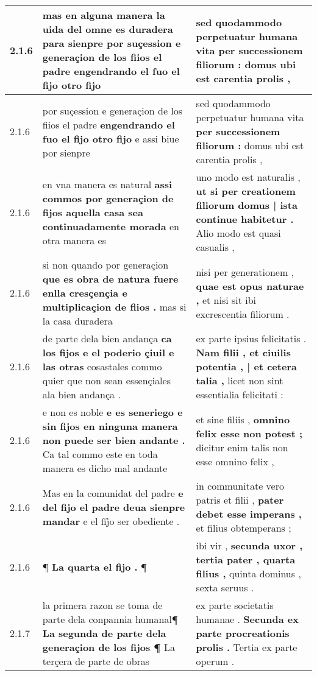\begin{tabular}{|p{1cm}|p{6.5cm}|p{6.5cm}|}
2.1.6 & mas en alguna manera la uida del omne es duradera para sienpre \textbf{ por suçession e generaçion de los fiios el padre } engendrando el fuo el fijo otro fijo & sed quodammodo perpetuatur humana vita \textbf{ per successionem filiorum : } domus ubi est carentia prolis , \\\hline
2.1.6 & por suçession e generaçion de los fiios el padre \textbf{ engendrando el fuo el fijo otro fijo } e assi biue por sienpre & sed quodammodo perpetuatur humana vita \textbf{ per successionem filiorum : } domus ubi est carentia prolis , \\\hline
2.1.6 & en vna manera es natural \textbf{ assi commos por generaçion de fijos aquella casa sea continuadamente morada } en otra manera es & uno modo est naturalis , \textbf{ ut si per creationem filiorum domus | ista continue habitetur . } Alio modo est quasi casualis , \\\hline
2.1.6 & si non quando por generaçion \textbf{ que es obra de natura fuere enlla cresçençia e multiplicaçion de fiios . } mas si la casa duradera & nisi per generationem , \textbf{ quae est opus naturae , } et nisi sit ibi excrescentia filiorum . \\\hline
2.1.6 & de parte dela bien andança \textbf{ ca los fijos e el poderio çiuil e las otras } cosastales commo quier que non sean essençiales ala bien andança . & ex parte ipsius felicitatis . \textbf{ Nam filii , et ciuilis potentia , | et cetera talia , } licet non sint essentialia felicitati : \\\hline
2.1.6 & e non es noble \textbf{ e es seneriego e sin fijos en ninguna manera non puede ser bien andante . } Ca tal commo este en toda manera es dicho mal andante & et sine filiis , \textbf{ omnino felix esse non potest ; } dicitur enim talis non esse omnino felix , \\\hline
2.1.6 & Mas en la comunidat del padre \textbf{ e del fijo el padre deua sienpre mandar } e el fij̉o ser obediente . & in communitate vero patris et filii , \textbf{ pater debet esse imperans , } et filius obtemperans ; \\\hline
2.1.6 & ¶ \textbf{ La quarta el fijo . } ¶ & ibi vir , \textbf{ secunda uxor , tertia pater , quarta filius , } quinta dominus , sexta seruus . \\\hline
2.1.7 & la primera razon se toma de parte dela conpannia humanal¶ \textbf{ La segunda de parte dela generaçion de los fijos ¶ } La terçera de parte de obras & ex parte societatis humanae . \textbf{ Secunda ex parte procreationis prolis . } Tertia ex parte operum . \\\hline

\end{tabular}
